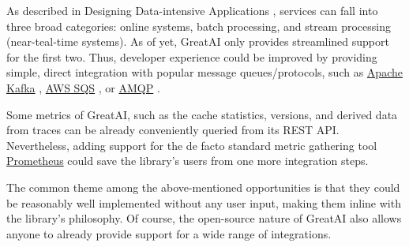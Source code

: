 As described in Designing Data-intensive Applications \cite{kleppmann2017designing}, services can fall into three broad categories: online systems, batch processing, and stream processing (near-teal-time systems). As of yet, GreatAI only provides streamlined support for the first two. Thus, developer experience could be improved by providing simple, direct integration with popular message queues/protocols, such as \href{https://kafka.apache.org/}{Apache Kafka} \cite{kreps2011kafka}, \href{https://aws.amazon.com/sqs/}{AWS SQS} \cite{garfinkel2007evaluation}, or \href{https://www.amqp.org/}{AMQP} \cite{vinoski2006advanced}.

Some metrics of GreatAI, such as the cache statistics, versions, and derived data from traces can be already conveniently queried from its REST API. Nevertheless, adding support for the de facto standard metric gathering tool \href{https://prometheus.io/}{Prometheus} could save the library's users from one more integration steps.

The common theme among the above-mentioned opportunities is that they could be reasonably well implemented without any user input, making them inline with the library's philosophy. Of course, the open-source nature of GreatAI also allows anyone to already provide support for a wide range of integrations.
